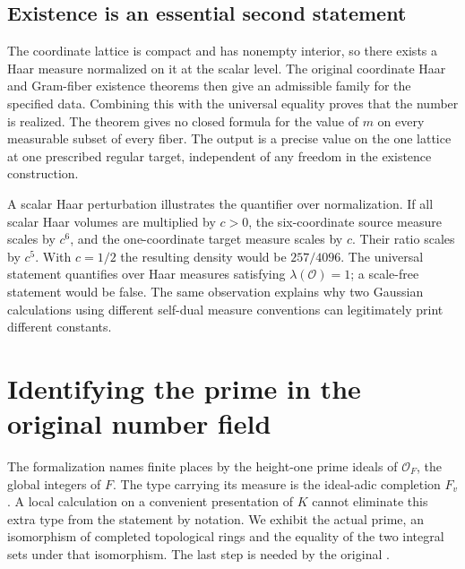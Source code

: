 \documentclass[12pt,letterpaper]{article}
\newcommand{\code}[1]{\texttt{\detokenize{#1}}}
\begin{document}
\subsection{Existence is an essential second statement}
The coordinate lattice is compact and has nonempty interior, so there exists a Haar measure normalized on it at the scalar level. The original coordinate Haar and Gram-fiber existence theorems then give an admissible family for the specified data. Combining this with the universal equality proves that the number is realized. The theorem gives no closed formula for the value of $m$ on every measurable subset of every fiber. The output is a precise value on the one lattice at one prescribed regular target, independent of any freedom in the existence construction.
\par
A scalar Haar perturbation illustrates the quantifier over normalization. If all scalar Haar volumes are multiplied by $c>0$, the six-coordinate source measure scales by $c^6$, and the one-coordinate target measure scales by $c$. Their ratio scales by $c^5$. With $c=1/2$ the resulting density would be $257/4096$. The universal statement quantifies over Haar measures satisfying $\lambda(\mathcal O)=1$; a scale-free statement would be false. The same observation explains why two Gaussian calculations using different self-dual measure conventions can legitimately print different constants.
\section{Identifying the prime in the original number field}
The formalization names finite places by the height-one prime ideals of $\mathcal O_F$, the global integers of $F$. The type carrying its measure is the ideal-adic completion $F_v$. A local calculation on a convenient presentation of $K$ cannot eliminate this extra type from the statement by notation. We exhibit the actual prime, an isomorphism of completed topological rings and the equality of the two integral sets under that isomorphism. The last step is needed by the original \code{latV}.
\end{document}
